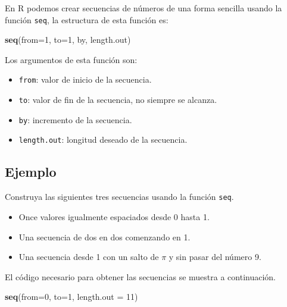 \documentclass[10pt,]{krantz}
\makeatletter
\newenvironment{Shaded}{\begin{snugshade}}{\end{snugshade}}
\newcommand{\KeywordTok}[1]{\textcolor[rgb]{0.13,0.29,0.53}{\textbf{{#1}}}}
\newcommand{\DataTypeTok}[1]{\textcolor[rgb]{0.13,0.29,0.53}{{#1}}}
\newcommand{\DecValTok}[1]{\textcolor[rgb]{0.00,0.00,0.81}{{#1}}}
\newcommand{\NormalTok}[1]{{#1}}
\providecommand{\tightlist}{%
  \setlength{\itemsep}{0pt}\setlength{\parskip}{0pt}}
\let\proglang=\textsf
\newenvironment{kframe}{%
\medskip{}
\setlength{\fboxsep}{.8em}
 \def\at@end@of@kframe{}%
 \ifinner\ifhmode%
  \def\at@end@of@kframe{\end{minipage}}%
  \begin{minipage}{\columnwidth}%
 \fi\fi%
 \def\FrameCommand##1{\hskip\@totalleftmargin \hskip-\fboxsep
 \colorbox{shadecolor}{##1}\hskip-\fboxsep
     \hskip-\linewidth \hskip-\@totalleftmargin \hskip\columnwidth}%
 \MakeFramed {\advance\hsize-\width
   \@totalleftmargin\z@ \linewidth\hsize
   \@setminipage}}%
 {\par\unskip\endMakeFramed%
 \at@end@of@kframe}
\renewenvironment{Shaded}{\begin{kframe}}{\end{kframe}}
\makeatother
\begin{document}
En \proglang{R} podemos crear secuencias de números de una forma
sencilla usando la función \texttt{seq}, la estructura de esta función
es:

\begin{Shaded}
\begin{Highlighting}[]
\KeywordTok{seq}\NormalTok{(}\DataTypeTok{from=}\DecValTok{1}\NormalTok{, }\DataTypeTok{to=}\DecValTok{1}\NormalTok{, by, length.out)}
\end{Highlighting}
\end{Shaded}

Los argumentos de esta función son:

\begin{itemize}
\tightlist
\item
  \texttt{from}: valor de inicio de la secuencia.
\item
  \texttt{to}: valor de fin de la secuencia, no siempre se alcanza.
\item
  \texttt{by}: incremento de la secuencia.
\item
  \texttt{length.out}: longitud deseado de la secuencia.
\end{itemize}

\subsection*{Ejemplo}\label{ejemplo-16}


Construya las siguientes tres secuencias usando la función \texttt{seq}.

\begin{itemize}
\tightlist
\item
  Once valores igualmente espaciados desde 0 hasta 1.
\item
  Una secuencia de dos en dos comenzando en 1.
\item
  Una secuencia desde 1 con un salto de \(\pi\) y sin pasar del número
  9.
\end{itemize}

El código necesario para obtener las secuencias se muestra a
continuación.

\begin{Shaded}
\begin{Highlighting}[]
\KeywordTok{seq}\NormalTok{(}\DataTypeTok{from=}\DecValTok{0}\NormalTok{, }\DataTypeTok{to=}\DecValTok{1}\NormalTok{, }\DataTypeTok{length.out =} \DecValTok{11}\NormalTok{)}
\end{Highlighting}
\end{Shaded}
\end{document}
